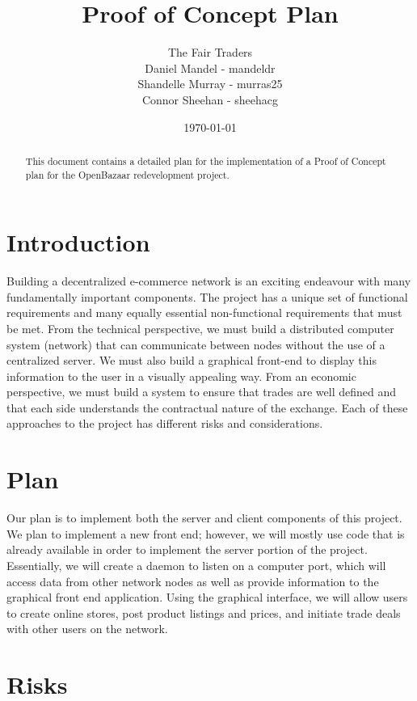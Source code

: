 \documentclass{article}
\begin{document}
\title{Proof of Concept Plan}
\author{The Fair Traders \\ Daniel Mandel - mandeldr \\ Shandelle Murray - murras25 \\ Connor Sheehan - sheehacg}
\date{\today}
\maketitle

\begin{abstract}
This document contains a detailed plan for the implementation of a Proof of Concept plan for the OpenBazaar redevelopment project.
\end{abstract}

\section{Introduction}
Building a decentralized e-commerce network is an exciting endeavour with many fundamentally important components. The project has a unique set of functional requirements and many equally essential non-functional requirements that must be met. From the technical perspective, we must build a distributed computer system (network) that can communicate between nodes without the use of a centralized server. We must also build a graphical front-end to display this information to the user in a visually appealing way. From an economic perspective, we must build a system to ensure that trades are well defined and that each side understands the contractual nature of the exchange. Each of these approaches to the project has different risks and considerations. 

\section{Plan}
Our plan is to implement both the server and client components of this project. We plan to implement a new front end; however, we will mostly use code that is already available in order to implement the server portion of the project. Essentially, we will create a daemon to listen on a computer port, which will access data from other network nodes as well as provide information to the graphical front end application. Using the graphical interface, we will allow users to create online stores, post product listings and prices, and initiate trade deals with other users on the network.


\section{Risks}
\end{document}

